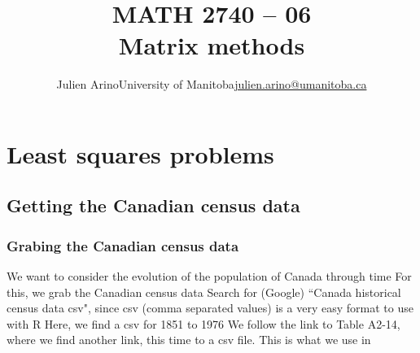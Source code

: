 \documentclass[aspectratio=169]{beamer}\usepackage[]{graphicx}\usepackage[]{xcolor}
\title[Matrix methods]{MATH 2740 -- 06\\ Matrix methods}
\author{\texorpdfstring{Julien Arino\newline University of Manitoba\newline\url{julien.arino@umanitoba.ca}}{Julien Arino}}
\date{}
\begin{document}


\section{Least squares problems}


\subsection{Getting the Canadian census data}

\begin{frame}\frametitle{Grabing the Canadian census data}
We want to consider the evolution of the population of Canada through time
\vfill
For this, we grab the Canadian census data
\vfill Search for (Google) ``Canada historical census data csv", since csv (comma separated values) is a very easy format to use with R
\vfill
Here, we find a csv for 1851 to 1976
\vfill
We follow the link to Table A2-14, where we find another link, this time to a csv file. This is what we use in 
\end{frame}
\end{document}
